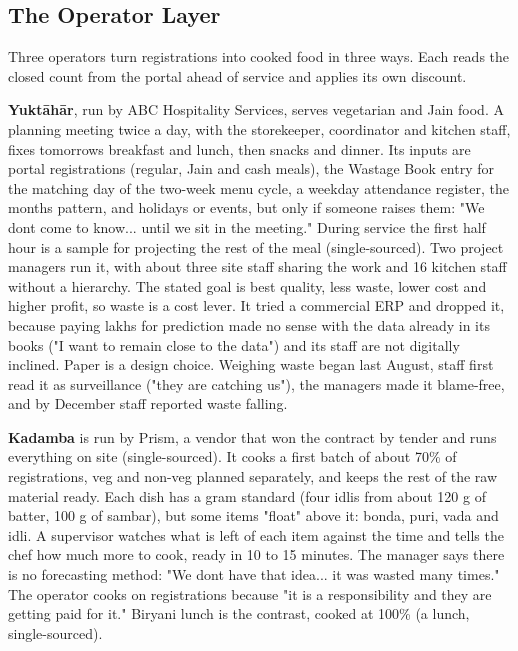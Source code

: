\documentclass[
  10pt,
  table]{article}
\begin{document}
\subsection{The Operator Layer}\label{the-operator-layer}

Three operators turn registrations into cooked food in three ways. Each reads the closed count from the portal ahead of service and applies its own discount.

\textbf{Yuktāhār}, run by ABC Hospitality Services, serves vegetarian and Jain food. A planning meeting twice a day, with the storekeeper, coordinator and kitchen staff, fixes tomorrow\textquotesingle s breakfast and lunch, then snacks and dinner. Its inputs are portal registrations (regular, Jain and cash meals), the Wastage Book entry for the matching day of the two-week menu cycle, a weekday attendance register, the month\textquotesingle s pattern, and holidays or events, but only if someone raises them: "We don\textquotesingle t come to know... until we sit in the meeting." During service the first half hour is a sample for projecting the rest of the meal (single-sourced). Two project managers run it, with about three site staff sharing the work and 16 kitchen staff without a hierarchy. The stated goal is best quality, less waste, lower cost and higher profit, so waste is a cost lever. It tried a commercial ERP and dropped it, because paying lakhs for prediction made no sense with the data already in its books ("I want to remain close to the data") and its staff are not digitally inclined. Paper is a design choice. Weighing waste began last August, staff first read it as surveillance ("they are catching us"), the managers made it blame-free, and by December staff reported waste falling.

\textbf{Kadamba} is run by Prism, a vendor that won the contract by tender and runs everything on site (single-sourced). It cooks a first batch of about 70\% of registrations, veg and non-veg planned separately, and keeps the rest of the raw material ready. Each dish has a gram standard (four idlis from about 120 g of batter, 100 g of sambar), but some items "float" above it: bonda, puri, vada and idli. A supervisor watches what is left of each item against the time and tells the chef how much more to cook, ready in 10 to 15 minutes. The manager says there is no forecasting method: "We don\textquotesingle t have that idea... it was wasted many times." The operator cooks on registrations because "it is a responsibility and they are getting paid for it." Biryani lunch is the contrast, cooked at 100\% (a lunch, single-sourced).
\end{document}
